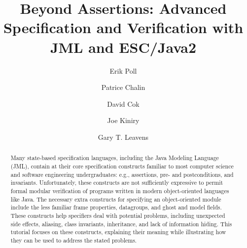 \documentclass{llncs}
\begin{document}
\title{Beyond Assertions: 
       Advanced Specification and Verification with JML and ESC/Java2}

\author{Erik Poll
        \and Patrice Chalin
        \and David Cok
        \and Joe Kiniry
        \and Gary T. Leavens 
       }



%
\newcommand{\GMARGIN}[1]{\marginpar{\textcolor{blue}{\sf\scriptsize #1}}}
\newcommand{\MARGIN}[1]{\marginpar{\sf\scriptsize #1}}
\newcommand{\COMMENT}[1]{{\sf\scriptsize  #1}}

\newcommand{\figref}[1]{\figurename~\ref{#1}}
\newcommand{\secref}[1]{Section~\ref{#1}}

\maketitle

\begin{abstract}
Many state-based specification languages, including the Java Modeling Language
(JML), contain at their core specification constructs familiar to most
computer science and software engineering undergraduates: e.g., assertions,
pre- and postconditions, and invariants.  Unfortunately, these constructs are
not sufficiently expressive to permit formal modular verification of programs
written in modern object-oriented languages like Java. The necessary extra
constructs for specifying an object-oriented module include the less familiar
frame properties, datagroups, and ghost and model fields.  These constructs
help specifiers deal with potential problems, including unexpected side
effects, aliasing, class invariants, inheritance, and lack of information
hiding.
%
This tutorial focuses on these constructs, explaining their meaning while
illustrating how they can be used to address the stated problems.
\end{abstract}
\end{document}
